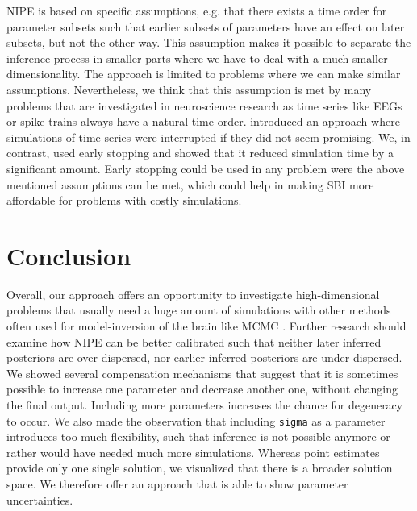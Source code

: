 \documentclass[12pt]{extreport}
\begin{document}
NIPE is based on specific assumptions, e.g. that there exists a time order for parameter subsets such that earlier subsets of parameters have an effect on later subsets, but not the other way. This assumption makes it possible to separate the inference process in smaller parts where we have to deal with a much smaller dimensionality. The approach is limited to problems where we can make similar assumptions. Nevertheless, we think that this assumption is met by many problems that are investigated in neuroscience research as time series like EEGs or spike trains always have a natural time order. 
\cite{prangle2016lazy} introduced an approach where simulations of time series were interrupted if they did not seem promising. We, in contrast, used early stopping and showed that it reduced simulation time by a significant amount. Early stopping could be used in any problem were the above mentioned assumptions can be met, which could help in making SBI more affordable for problems with costly simulations.  \\



\section{Conclusion}

Overall, our approach offers an opportunity to investigate high-dimensional problems that usually need a huge amount of simulations with other methods often used for model-inversion of the brain like MCMC \citep{hashemi_bayesian_2020}. 
Further research should examine how NIPE can be better calibrated such that neither later inferred posteriors are over-dispersed, nor earlier inferred posteriors are under-dispersed.\\

We showed several compensation mechanisms that suggest that it is sometimes possible to increase one parameter and decrease another one, without changing the final output. Including more parameters increases the chance for degeneracy to occur. We also made the observation that including \texttt{sigma} as a parameter introduces too much flexibility, such that inference is not possible anymore or rather would have needed much more simulations. Whereas point estimates provide only one single solution, we visualized that there is a broader solution space. We therefore offer an approach that is able to show parameter uncertainties. \\
\end{document}
